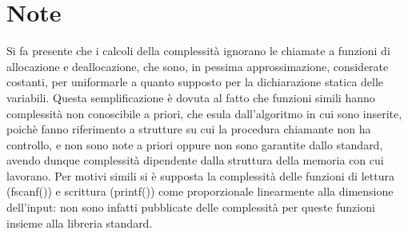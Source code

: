 \documentclass[a4paper,11pt]{Article}
\begin{document}
\section{Note}
Si fa presente che i calcoli della complessità ignorano le chiamate a funzioni di allocazione e deallocazione, che sono, in pessima approssimazione, considerate costanti, per uniformarle a quanto supposto per la dichiarazione statica delle variabili. Questa semplificazione è dovuta al fatto che funzioni simili hanno complessità non conoscibile a priori, che esula dall'algoritmo in cui sono inserite, poichè fanno riferimento a strutture su cui la procedura chiamante non ha controllo, e non sono note a priori oppure non sono garantite dallo standard, avendo dunque complessità dipendente dalla struttura della memoria con cui lavorano.
Per motivi simili si è supposta la complessità delle funzioni di lettura (fscanf()) e scrittura (printf()) come proporzionale linearmente alla dimensione dell'input: non sono infatti pubblicate delle complessità per queste funzioni insieme alla libreria standard.
\end{document}
